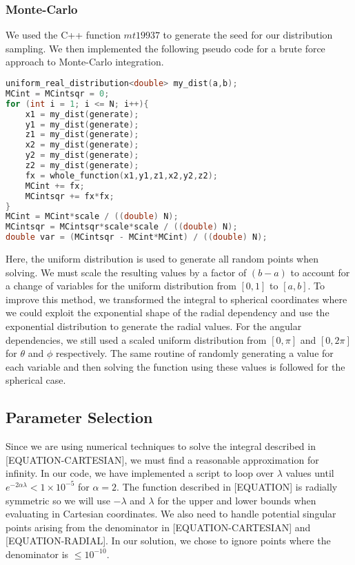 \documentclass{emulateapj}
\begin{document}
\subsubsection{Monte-Carlo}
We used the C++ function $mt19937$ to generate the seed for our distribution sampling. We then implemented the following pseudo code for a brute force approach to Monte-Carlo integration.
\begin{lstlisting}[language=c++]
uniform_real_distribution<double> my_dist(a,b);
MCint = MCintsqr = 0;
for (int i = 1; i <= N; i++){
    x1 = my_dist(generate);
    y1 = my_dist(generate);
    z1 = my_dist(generate);
    x2 = my_dist(generate);
    y2 = my_dist(generate);
    z2 = my_dist(generate);
    fx = whole_function(x1,y1,z1,x2,y2,z2);
    MCint += fx;
    MCintsqr += fx*fx;
}
MCint = MCint*scale / ((double) N);
MCintsqr = MCintsqr*scale*scale / ((double) N);
double var = (MCintsqr - MCint*MCint) / ((double) N);
\end{lstlisting}
Here, the uniform distribution is used to generate all random points when solving. We must scale the resulting values by a factor of $(b-a)$ to account for a change of variables for the uniform distribution from $[0,1]$ to $[a,b]$. To improve this method, we transformed the integral to spherical coordinates where we could exploit the exponential shape of the radial dependency and use the exponential distribution to generate the radial values. For the angular dependencies, we still used a scaled uniform distribution from $[0,\pi]$ and $[0,2\pi]$ for $\theta$ and $\phi$ respectively. The same routine of randomly generating a value for each variable and then solving the function using these values is followed for the spherical case.
\subsection{Parameter Selection}
\label{subsec:parameters}
Since we are using numerical techniques to solve the integral described in [EQUATION-CARTESIAN], we must find a reasonable approximation for infinity. In our code, we have implemented a script to loop over $\lambda$ values until $e^{-2\alpha\lambda} < 1\times10^{-5}$ for $\alpha = 2$. The function described in [EQUATION] is radially symmetric so we will use $-\lambda$ and $\lambda$ for the upper and lower bounds when evaluating in Cartesian coordinates. We also need to handle potential singular points arising from the denominator in [EQUATION-CARTESIAN] and [EQUATION-RADIAL]. In our solution, we chose to ignore points where the denominator is $\leq 10^{-10}$.
\end{document}
